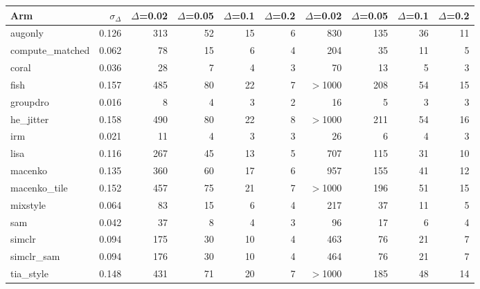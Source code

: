 \begin{tabular}{lrrrrrrrrr}
\toprule
Arm & $\sigma_\Delta$ & $\Delta$=0.02 & $\Delta$=0.05 & $\Delta$=0.1 & $\Delta$=0.2 & $\Delta$=0.02 & $\Delta$=0.05 & $\Delta$=0.1 & $\Delta$=0.2 \\
\midrule
augonly & 0.126 & 313 & 52 & 15 & 6 & 830 & 135 & 36 & 11 \\
compute\_matched & 0.062 & 78 & 15 & 6 & 4 & 204 & 35 & 11 & 5 \\
coral & 0.036 & 28 & 7 & 4 & 3 & 70 & 13 & 5 & 3 \\
fish & 0.157 & 485 & 80 & 22 & 7 & $>$1000 & 208 & 54 & 15 \\
groupdro & 0.016 & 8 & 4 & 3 & 2 & 16 & 5 & 3 & 3 \\
he\_jitter & 0.158 & 490 & 80 & 22 & 8 & $>$1000 & 211 & 54 & 16 \\
irm & 0.021 & 11 & 4 & 3 & 3 & 26 & 6 & 4 & 3 \\
lisa & 0.116 & 267 & 45 & 13 & 5 & 707 & 115 & 31 & 10 \\
macenko & 0.135 & 360 & 60 & 17 & 6 & 957 & 155 & 41 & 12 \\
macenko\_tile & 0.152 & 457 & 75 & 21 & 7 & $>$1000 & 196 & 51 & 15 \\
mixstyle & 0.064 & 83 & 15 & 6 & 4 & 217 & 37 & 11 & 5 \\
sam & 0.042 & 37 & 8 & 4 & 3 & 96 & 17 & 6 & 4 \\
simclr & 0.094 & 175 & 30 & 10 & 4 & 463 & 76 & 21 & 7 \\
simclr\_sam & 0.094 & 176 & 30 & 10 & 4 & 464 & 76 & 21 & 7 \\
tia\_style & 0.148 & 431 & 71 & 20 & 7 & $>$1000 & 185 & 48 & 14 \\
\bottomrule
\end{tabular}
